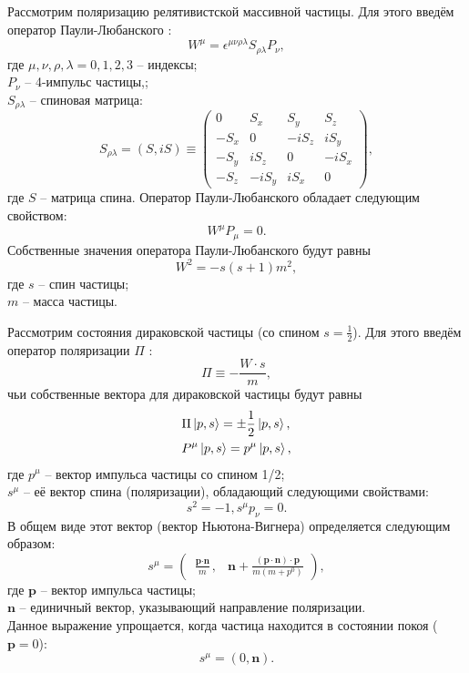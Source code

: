 \documentclass{extreport}
\begin{document}
Рассмотрим поляризацию релятивистской массивной частицы. Для этого введём оператор Паули-Любанского \cite{banerjee}:
\begin{equation}
	W^\mu = \epsilon^{\mu\nu\rho\lambda}S_{\rho\lambda}P_\nu,
\end{equation}
где $\mu, \nu, \rho, \lambda = 0, 1, 2, 3$ -- индексы; \\ $P_\nu$ -- 4-импульс частицы,; \\ $S_{\rho\lambda}$ -- спиновая матрица:
\begin{equation}
	S_{\rho\lambda} = (S, iS) \equiv \begin{pmatrix}
		0&S_x&S_y&S_z\\-S_x&0&-iS_z&iS_y\\-S_y&iS_z&0&-iS_x\\-S_z&-iS_y&iS_x&0
	\end{pmatrix},
\end{equation}
где $S$ -- матрица спина. Оператор Паули-Любанского обладает следующим свойством:
\begin{equation}
	W^\mu P_\mu = 0.
\end{equation}
Собственные значения оператора Паули-Любанского будут равны
\begin{equation}
	W^2 = -s(s+1)m^2,
\end{equation}
где $s$ -- спин частицы; \\ $m$ -- масса частицы.

Рассмотрим состояния дираковской частицы (со спином $s=\frac{1}{2}$). Для этого введём оператор поляризации $\Pi$ \cite{Barone_2002}:
\begin{equation}
	\Pi \equiv - \frac{W \cdot s}{m},
\end{equation}
чьи собственные вектора для дираковской частицы будут равны
\begin{equation}
	\begin{split}
		& \Pi \ket{p, s} = \pm \frac{1}{2} \ket{p, s}, \\
		& P^\mu \ket{p, s} = p^\mu \ket{p, s},
	\end{split}
\end{equation}
где $p^\mu$ -- вектор импульса частицы со спином 1/2; \\ $s^\mu$ -- её вектор спина (поляризации), обладающий следующими свойствами:
\begin{equation}
	s^2 = -1, s^\mu p_\nu = 0.
\end{equation}
В общем виде этот вектор (вектор Ньютона-Вигнера) определяется следующим образом:
\begin{equation}
	s^\mu = \begin{pmatrix}
		\frac{\textbf{p}\cdot \textbf{n}}{m}, & \textbf{n} + \frac{(\textbf{p}\cdot \textbf{n}) \cdot \textbf{p}}{m(m+p^0)}
	\end{pmatrix},
\end{equation}
где $\textbf{p}$ -- вектор импульса частицы; \\ $\textbf{n}$ -- единичный вектор, указывающий направление поляризации. \\ Данное выражение упрощается, когда частица находится в состоянии покоя ($\textbf{p} = 0$):
\begin{equation}
	s^\mu = (0, \textbf{n}).
\end{equation}
\end{document}
